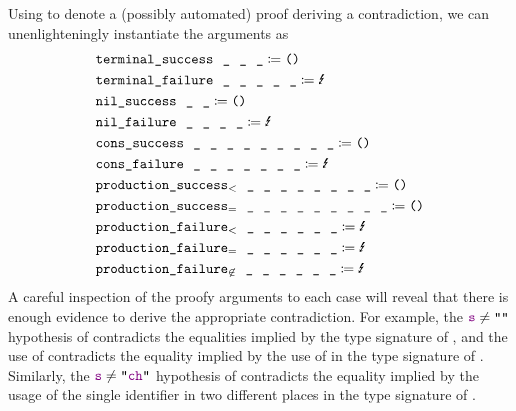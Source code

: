   Using \Lightning{} to denote a (possibly automated) proof deriving a contradiction, we can unenlighteningly instantiate the arguments as
  \begin{align*}
    & \fname{terminal\_success}~~\termhole~~\termhole~~\termhole \defeq \unittt \\
    & \fname{terminal\_failure}~~\termhole~~\termhole~~\termhole~~\termhole~~\termhole \defeq \text{\Lightning} \\
    & \fname{nil\_success}~~\termhole~~\termhole \defeq \unittt \\
    & \fname{nil\_failure}~~\termhole~~\termhole~~\termhole~~\termhole \defeq \text{\Lightning} \\
    & \fname{cons\_success}~~\termhole~~\termhole~~\termhole~~\termhole~~\termhole~~\termhole~~\termhole~~\termhole~~\termhole \defeq \unittt \\
    & \fname{cons\_failure}~~\termhole~~\termhole~~\termhole~~\termhole~~\termhole~~\termhole~~\termhole \defeq \text{\Lightning} \\
    & \fname{production\_success$_<$}~~\termhole~~\termhole~~\termhole~~\termhole~~\termhole~~\termhole~~\termhole~~\termhole \defeq \unittt \\
    & \fname{production\_success$_=$}~~\termhole~~\termhole~~\termhole~~\termhole~~\termhole~~\termhole~~\termhole~~\termhole~~\termhole \defeq \unittt \\
    & \fname{production\_failure$_<$}~~\termhole~~\termhole~~\termhole~~\termhole~~\termhole~~\termhole \defeq \text{\Lightning} \\
    & \fname{production\_failure$_=$}~~\termhole~~\termhole~~\termhole~~\termhole~~\termhole~~\termhole \defeq \text{\Lightning} \\
    & \fname{production\_failure$_{\not\in}$}~~\termhole~~\termhole~~\termhole~~\termhole~~\termhole~~\termhole \defeq \text{\Lightning}
  \end{align*}
  A careful inspection of the proofy arguments to each  case will reveal that there is enough evidence to derive the appropriate contradiction.  For example, the $\farg{s}\neq\str{}$ hypothesis of  contradicts the equalities implied by the type signature of , and the use of \nil\space contradicts the equality implied by the use of  in the type signature of .  Similarly, the $\farg{s}\neq\str{\farg{ch}}$ hypothesis of  contradicts the equality implied by the usage of the single identifier  in two different places in the type signature of .

